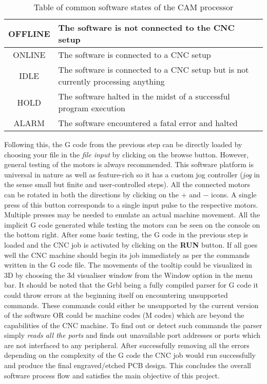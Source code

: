 \begin{table}[h]
\def\arraystretch{1.5}
    \begin{center}
    \caption{Table of common software states of the CAM processor}
    \begin{tabular}{|c|l|}
        \hline
		OFFLINE & The software is not connected to the CNC setup  \\
		\hline
		ONLINE & The software is connected to a CNC setup \\
		\hline
		IDLE & The software is connected to a CNC setup but is not currently processing anything \\ 
		\hline 
		HOLD &	The software halted in the midst of a successful program execution  \\
		\hline
		ALARM &	The software encountered a fatal error and halted \\
		\hline
    \end{tabular}    
    \end{center}
    \label{tab:soft_states}
\end{table}


Following this, the G code from the previous step can be directly loaded by choosing your file in the \textit{file input} by clicking on the browse button. However, general testing of the motors is always recommended. This software platform is universal in nature as well as feature-rich so it has a custom jog controller (\textit{jog} in the sense small but finite and user-controlled steps). All the connected motors can be rotated in both the directions by clicking on the $\boldsymbol{+}$ and $\boldsymbol{-}$ icons. A single press of this button corresponds to a single input pulse to the respective motors. Multiple presses may be needed to emulate an actual machine movement. All the implicit G code generated while testing the motors can be seen on the console on the bottom right. After some basic testing, the G code in the previous step is loaded and the CNC job is activated by clicking on the \textbf{RUN} button. If all goes well the CNC machine should begin its job immediately as per the commands written in the G code file. The movements of the tooltip could be visualized in 3D by choosing the 3d visualiser window from the Window option in the menu bar. It should be noted that the Grbl being a fully compiled parser for G code it could throw errors at the beginning itself on encountering unsupported commands. These commands could either be unsupported by the current version of the software OR could be machine codes (M codes) which are beyond the capabilities of the CNC machine. To find out or detect such commands the parser simply \textit{reads all the ports} and finds out unavailable port addresses or ports which are not interfaced to any peripheral. After successfully removing all the errors depending on the complexity of the G code the CNC job would run successfully and produce the final engraved/etched PCB design. This concludes the overall software process flow and satisfies the main objective of this project.



